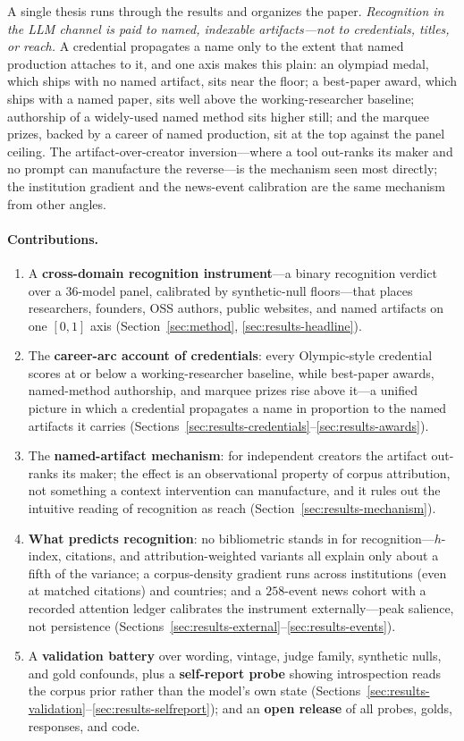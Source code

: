 \documentclass[11pt]{article}
\begin{document}
A single thesis runs through the results and organizes the paper. \emph{Recognition in the LLM channel is paid to named, indexable artifacts---not to credentials, titles, or reach.} A credential propagates a name only to the extent that named production attaches to it, and one axis makes this plain: an olympiad medal, which ships with no named artifact, sits near the floor; a best-paper award, which ships with a named paper, sits well above the working-researcher baseline; authorship of a widely-used named method sits higher still; and the marquee prizes, backed by a career of named production, sit at the top against the panel ceiling. The artifact-over-creator inversion---where a tool out-ranks its maker and no prompt can manufacture the reverse---is the mechanism seen most directly; the institution gradient and the news-event calibration are the same mechanism from other angles.

\paragraph{Contributions.}
\begin{enumerate}[leftmargin=*,itemsep=1pt]
    \item A \textbf{cross-domain recognition instrument}---a binary recognition verdict over a $36$-model panel, calibrated by synthetic-null floors---that places researchers, founders, OSS authors, public websites, and named artifacts on one $[0,1]$ axis (Section~\ref{sec:method}, \ref{sec:results-headline}).
    \item The \textbf{career-arc account of credentials}: every Olympic-style credential scores at or below a working-researcher baseline, while best-paper awards, named-method authorship, and marquee prizes rise above it---a unified picture in which a credential propagates a name in proportion to the named artifacts it carries (Sections~\ref{sec:results-credentials}--\ref{sec:results-awards}).
    \item The \textbf{named-artifact mechanism}: for independent creators the artifact out-ranks its maker; the effect is an observational property of corpus attribution, not something a context intervention can manufacture, and it rules out the intuitive reading of recognition as reach (Section~\ref{sec:results-mechanism}).
    \item \textbf{What predicts recognition}: no bibliometric stands in for recognition---$h$-index, citations, and attribution-weighted variants all explain only about a fifth of the variance; a corpus-density gradient runs across institutions (even at matched citations) and countries; and a $258$-event news cohort with a recorded attention ledger calibrates the instrument externally---peak salience, not persistence (Sections~\ref{sec:results-external}--\ref{sec:results-events}).
    \item A \textbf{validation battery} over wording, vintage, judge family, synthetic nulls, and gold confounds, plus a \textbf{self-report probe} showing introspection reads the corpus prior rather than the model's own state (Sections~\ref{sec:results-validation}--\ref{sec:results-selfreport}); and an \textbf{open release} of all probes, golds, responses, and code.
\end{enumerate}
\end{document}
